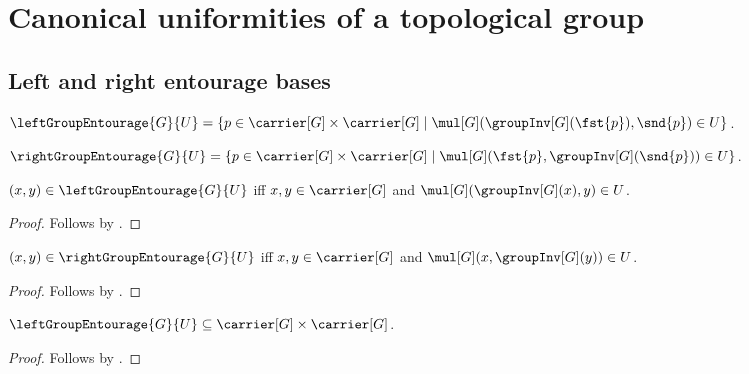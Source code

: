 




\section{Canonical uniformities of a topological group}

\subsection{Left and right entourage bases}

\begin{definition}\label{left_group_entourage}
    $\leftGroupEntourage{G}{U}=
        \{p\in\carrier[G]\times\carrier[G]\mid
            \mul[G](\groupInv[G](\fst{p}),\snd{p})\in U\}$.
\end{definition}

\begin{definition}\label{right_group_entourage}
    $\rightGroupEntourage{G}{U}=
        \{p\in\carrier[G]\times\carrier[G]\mid
            \mul[G](\fst{p},\groupInv[G](\snd{p}))\in U\}$.
\end{definition}

\begin{proposition}\label{left_group_entourage_iff}
    $(x,y)\in\leftGroupEntourage{G}{U}$ iff
        $x,y\in\carrier[G]$ and
        $\mul[G](\groupInv[G](x),y)\in U$.
\end{proposition}
\begin{proof}
    Follows by
        .
\end{proof}

\begin{proposition}\label{right_group_entourage_iff}
    $(x,y)\in\rightGroupEntourage{G}{U}$ iff
        $x,y\in\carrier[G]$ and
        $\mul[G](x,\groupInv[G](y))\in U$.
\end{proposition}
\begin{proof}
    Follows by
        .
\end{proof}

\begin{proposition}\label{left_group_entourage_type}
    $\leftGroupEntourage{G}{U}
        \subseteq\carrier[G]\times\carrier[G]$.
\end{proposition}
\begin{proof}
    Follows by .
\end{proof}


